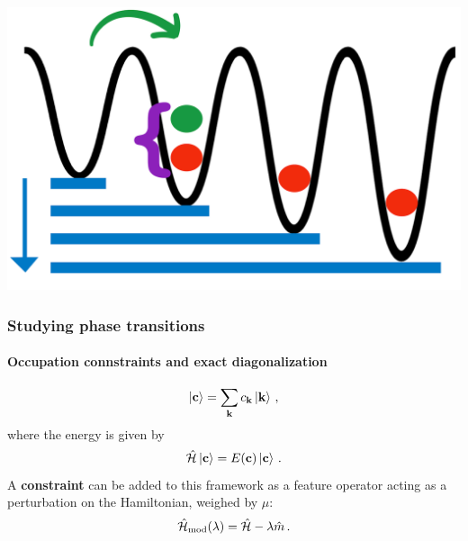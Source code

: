 \documentclass[aspectratio=169]{beamer}
\renewcommand\emph[1]{\textcolor{ugent_blue}{\textbf{#1}}}
\begin{document}
\begin{frame}
\begin{onlyenv}
\begin{equation}
  \end{equation}
  \begin{center}
    \includegraphics[scale=0.1]{../img/u.png}
  \end{center}
\end{onlyenv}
\end{frame}

\begin{frame}
  \frametitle{Studying phase transitions}
  \framesubtitle{Occupation connstraints and exact diagonalization}
  \begin{equation}
    \ket{\vb{c}} = \sum_{\vb{k}}c_{\vb{k}}\ket{\vb{k}}\thinspace ,
    \label{eq:fock_space}
  \end{equation}
  where the energy is given by
  \begin{equation}
    \hat{\mathcal{H}} \ket{\vb{c}} = E(\vb{c}) \ket{\vb{c}} \thinspace .
    \label{eq:FCI_energy}
  \end{equation}
  A \emph{constraint} can be added to this framework as a feature operator acting as a perturbation on the Hamiltonian, weighed by $\mu$:
  \begin{equation} \label{eq:modified_hamiltonian}
    \hat{\mathcal{H}}_{\text{mod}}(\lambda) = \hat{\mathcal{H}} - \lambda \hat{m} \thinspace .
  \end{equation}
\end{frame}
\end{document}
